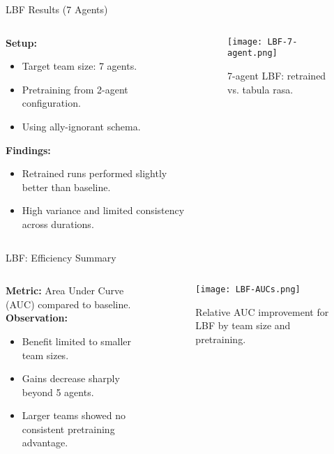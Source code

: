\begin{frame}{LBF Results (7 Agents)}
    \begin{columns}
        \begin{column}{0.45\linewidth}
            \textbf{Setup:}
            \begin{itemize}
                \item Target team size: 7 agents.
                \item Pretraining from 2-agent configuration.
                \item Using ally-ignorant schema.
            \end{itemize}
            \textbf{Findings:}
            \begin{itemize}
                \item Retrained runs performed slightly better than baseline.
                \item High variance and limited consistency across durations.
            \end{itemize}
        \end{column}
        \begin{column}{0.55\linewidth}
            \begin{figure}
                \texttt{[image: LBF-7-agent.png]}
                \caption{7-agent LBF: retrained vs. tabula rasa.}
            \end{figure}
        \end{column}
    \end{columns}
\end{frame}

\begin{frame}{LBF: Efficiency Summary}
    \begin{columns}
        \begin{column}{0.45\linewidth}
            \textbf{Metric:} Area Under Curve (AUC) compared to baseline. \\
            \textbf{Observation:}
            \begin{itemize}
                \item Benefit limited to smaller team sizes.
                \item Gains decrease sharply beyond 5 agents.
                \item Larger teams showed no consistent pretraining advantage.
            \end{itemize}
        \end{column}
        \begin{column}{0.55\linewidth}
            \begin{figure}
                \texttt{[image: LBF-AUCs.png]}
                \caption{Relative AUC improvement for LBF by team size and pretraining.}
            \end{figure}
        \end{column}
    \end{columns}
\end{frame}


